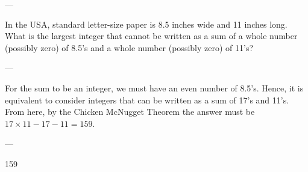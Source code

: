 
---

In the USA, standard letter-size paper is 8.5 inches wide and 11 inches long. What is the largest integer that cannot be written as a sum of a whole number (possibly zero) of 8.5's and a whole number (possibly zero) of 11's?

---

For the sum to be an integer, we must have an even number of 8.5's. Hence, it is equivalent to consider integers that can be written as a sum of 17's and 11's. From here, by the Chicken McNugget Theorem the answer must be $17\times11-17-11=159$.

---

159

